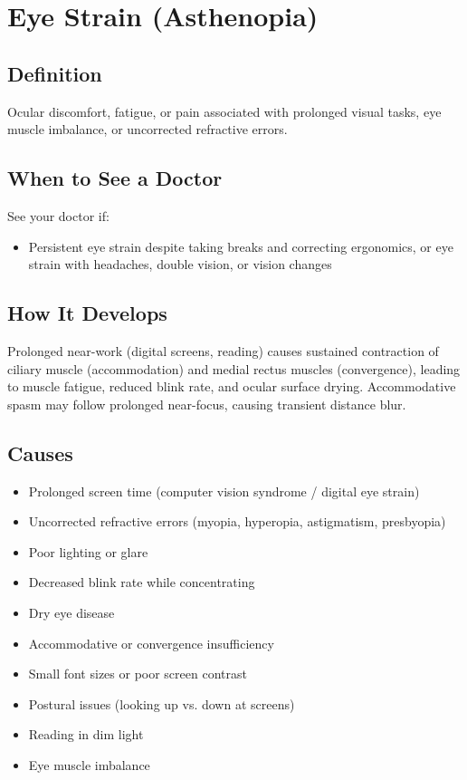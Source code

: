 \chapter{Eye Strain (Asthenopia)}

\section*{Definition}
Ocular discomfort, fatigue, or pain associated with prolonged visual tasks, eye muscle imbalance, or uncorrected refractive errors.

\section*{When to See a Doctor}
See your doctor if:
\begin{itemize}
  \item Persistent eye strain despite taking breaks and correcting ergonomics, or eye strain with headaches, double vision, or vision changes
\end{itemize}

\section*{How It Develops}
Prolonged near-work (digital screens, reading) causes sustained contraction of ciliary muscle (accommodation) and medial rectus muscles (convergence), leading to muscle fatigue, reduced blink rate, and ocular surface drying. Accommodative spasm may follow prolonged near-focus, causing transient distance blur.

\section*{Causes}
\begin{itemize}
  \item Prolonged screen time (computer vision syndrome / digital eye strain)
  \item Uncorrected refractive errors (myopia, hyperopia, astigmatism, presbyopia)
  \item Poor lighting or glare
  \item Decreased blink rate while concentrating
  \item Dry eye disease
  \item Accommodative or convergence insufficiency
  \item Small font sizes or poor screen contrast
  \item Postural issues (looking up vs. down at screens)
  \item Reading in dim light
  \item Eye muscle imbalance
\end{itemize}

